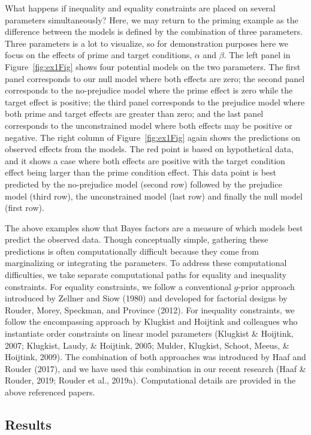 \documentclass[english,,man]{apa6}
\begin{document}
What happens if inequality and equality constraints are placed on several parameters simultaneously? Here, we may return to the priming example as the difference between the models is defined by the combination of three parameters. Three parameters is a lot to visualize, so for demonstration purposes here we focus on the effects of prime and target conditions, \(\alpha\) and \(\beta\). The left panel in Figure~\ref{fig:ex1Fig} shows four potential models on the two parameters. The first panel corresponds to our null model where both effects are zero; the second panel corresponds to the no-prejudice model where the prime effect is zero while the target effect is positive; the third panel corresponds to the prejudice model where both prime and target effects are greater than zero; and the last panel corresponds to the unconstrained model where both effects may be positive or negative. The right column of Figure~\ref{fig:ex1Fig} again shows the predictions on observed effects from the models. The red point is based on hypothetical data, and it shows a case where both effects are positive with the target condition effect being larger than the prime condition effect. This data point is best predicted by the no-prejudice model (second row) followed by the prejudice model (third row), the unconstrained model (last row) and finally the null model (first row).

The above examples show that Bayes factors are a measure of which models best predict the observed data. Though conceptually simple, gathering these predictions is often computationally difficult because they come from marginalizing or integrating the parameters. To address these computational difficulties, we take separate computational paths for equality and inequality constraints. For equality constraints, we follow a conventional \(g\)-prior approach introduced by Zellner and Siow (1980) and developed for factorial designs by Rouder, Morey, Speckman, and Province (2012). For inequality constraints, we follow the encompassing approach by Klugkist and Hoijtink and colleagues who instantiate order constraints on linear model parameters (Klugkist \& Hoijtink, 2007; Klugkist, Laudy, \& Hoijtink, 2005; Mulder, Klugkist, Schoot, Meeus, \& Hoijtink, 2009). The combination of both approaches was introduced by Haaf and Rouder (2017), and we have used this combination in our recent research (Haaf \& Rouder, 2019; Rouder et al., 2019a). Computational details are provided in the above referenced papers.

\hypertarget{results}{%
\subsection{Results}\label{results}}
\end{document}
